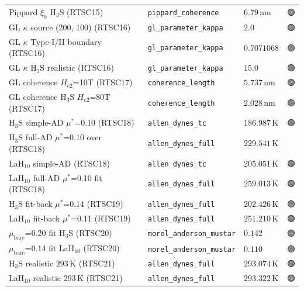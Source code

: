 \documentclass[11pt,a4paper]{article}
\providecommand{\tierGreen}{🟢}
\providecommand{\tierRed}{🔴}
\begin{document}
\begin{table}[h]
\begin{tabular}{@{}lllc@{}}
Pippard $\xi_0$ H$_3$S (RTSC15)                             & \texttt{pippard\_coherence}     & $6.79$\,nm       & \tierGreen \\
GL $\kappa$ source (200, 100) (RTSC16)                      & \texttt{gl\_parameter\_kappa}   & $2.0$            & \tierGreen \\
GL $\kappa$ Type-I/II boundary (RTSC16)                     & \texttt{gl\_parameter\_kappa}   & $0.7071068$      & \tierGreen \\
GL $\kappa$ H$_3$S realistic (RTSC16)                       & \texttt{gl\_parameter\_kappa}   & $15.0$           & \tierGreen \\
GL coherence $H_{c2}$=10T (RTSC17)                          & \texttt{coherence\_length}      & $5.737$\,nm      & \tierGreen \\
GL coherence H$_3$S $H_{c2}$=80T (RTSC17)                   & \texttt{coherence\_length}      & $2.028$\,nm      & \tierGreen \\
H$_3$S simple-AD $\mu^*$=0.10 (RTSC18)                      & \texttt{allen\_dynes\_tc}       & $186.987$\,K     & \tierGreen \\
H$_3$S full-AD $\mu^*$=0.10 over (RTSC18)                   & \texttt{allen\_dynes\_full}     & $229.541$\,K     & \tierRed   \\
LaH$_{10}$ simple-AD (RTSC18)                               & \texttt{allen\_dynes\_tc}       & $205.051$\,K     & \tierGreen \\
LaH$_{10}$ full-AD $\mu^*$=0.10 fit (RTSC18)                & \texttt{allen\_dynes\_full}     & $259.013$\,K     & \tierGreen \\
H$_3$S fit-back $\mu^*$=0.14 (RTSC19)                       & \texttt{allen\_dynes\_full}     & $202.426$\,K     & \tierGreen \\
LaH$_{10}$ fit-back $\mu^*$=0.11 (RTSC19)                   & \texttt{allen\_dynes\_full}     & $251.210$\,K     & \tierGreen \\
$\mu_{\text{bare}}$=0.20 fit H$_3$S (RTSC20)                & \texttt{morel\_anderson\_mustar} & $0.142$         & \tierGreen \\
$\mu_{\text{bare}}$=0.14 fit LaH$_{10}$ (RTSC20)            & \texttt{morel\_anderson\_mustar} & $0.110$         & \tierGreen \\
H$_3$S realistic $293$\,K (RTSC21)                          & \texttt{allen\_dynes\_full}     & $293.074$\,K     & \tierGreen \\
LaH$_{10}$ realistic $293$\,K (RTSC21)                      & \texttt{allen\_dynes\_full}     & $293.322$\,K     & \tierGreen \\

\end{tabular}
\end{table}
\end{document}
